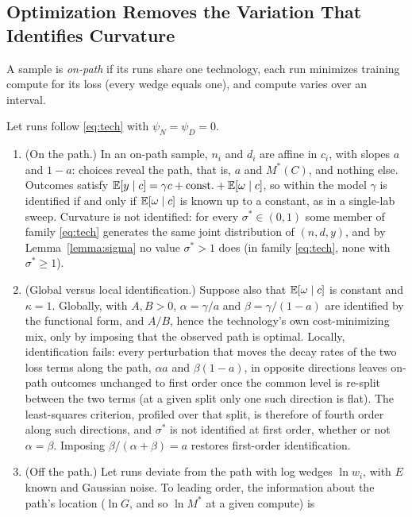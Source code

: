 \subsection{Optimization Removes the Variation That Identifies Curvature}\label{sec:ident-onpath}

A sample is \emph{on-path} if its runs share one technology, each run minimizes training compute for its loss (every
wedge equals one), and compute varies over an interval.

\begin{proposition}\label{prop:ident}
Let runs follow \eqref{eq:tech} with $\psi_N=\psi_D=0$.
\begin{enumerate}
\item[(i)] (On the path.) In an on-path sample, $n_i$ and $d_i$ are affine in $c_i$, with slopes $a$ and $1-a$:
choices reveal the path, that is, $a$ and $M^*(C)$, and nothing else. Outcomes satisfy
$\mathbb{E}[y\mid c]=\gamma c+\mathrm{const.}+\mathbb{E}[\omega\mid c]$, so within the model $\gamma$ is identified if and only if
$\mathbb{E}[\omega\mid c]$ is known up to a constant, as in a single-lab sweep. Curvature is not identified: for every
$\sigma^*\in(0,1)$ some member of family \eqref{eq:tech} generates the same joint distribution of $(n,d,y)$, and by
Lemma~\ref{lemma:sigma} no value $\sigma^*>1$ does (in family \eqref{eq:tech}, none with $\sigma^*\ge1$).
\item[(ii)] (Global versus local identification.) Suppose also that $\mathbb{E}[\omega\mid c]$ is constant and $\kappa=1$.
Globally, with $A,B>0$, $\alpha=\gamma/a$ and $\beta=\gamma/(1-a)$ are identified by the functional form, and $A/B$, hence the
technology's own cost-minimizing mix, only by imposing that the observed path is optimal. Locally, identification fails:
every perturbation that moves the decay rates of the two loss terms along the path, $\alpha a$ and $\beta(1-a)$, in
opposite directions leaves on-path outcomes unchanged to first order once the common level is re-split between the two
terms (at a given split only one such direction is flat). The least-squares criterion, profiled over that split, is
therefore of fourth order along such directions, and $\sigma^*$ is not identified at first order, whether or not $\alpha=\beta$. Imposing
$\beta/(\alpha+\beta)=a$ restores first-order identification.
\item[(iii)] (Off the path.) Let runs deviate from the path with log wedges $\ln w_i$, with $E$ known and Gaussian noise.
To leading order, the information about the path's location ($\ln G$, and so $\ln M^*$ at a given compute) is

\end{enumerate}
\end{proposition}
